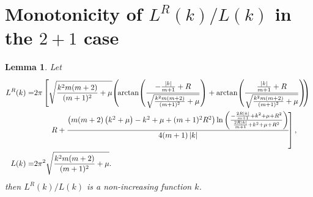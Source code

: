 \documentclass[a4paper,11pt]{article}
\newtheorem{lemma}{Lemma}
\numberwithin{equation}{section}
\begin{document}
\section{Monotonicity of $ L^R(k)/L(k)$ in the $ 2+1 $ case }
\label{AppendixMonotonicityOfL^R/L}
\begin{lemma}\label{lemmaMonotonicityOfL^R/L}
	Let \begin{equation}
	\begin{aligned}
	L^R(k)=&2 \pi  \left[\sqrt{\frac{k^2 m (m+2)}{(m+1)^2}+\mu }\! \left(\!\arctan\!\left(\frac{-\frac{\left| k\right|}{m+1}+R}{ \sqrt{\frac{k^2 m (m+2)}{(m+1)^2}+\mu }}\right)+\arctan\!\left(\frac{\frac{\left| k\right| }{m+1}+R}{\sqrt{\frac{k^2 m (m+2)}{(m+1)^2}+\mu }}\right)\!\!\right)\vphantom{\frac{\ln\left(\frac{\frac{R}{R}}{\frac{R}{R}}\right)}{R}}\right.
	\\&
	\left.\qquad R+\frac{\left(m (m+2) \left(k^2+\mu \right)-k^2+\mu +(m+1)^2 R^2\right) \ln \left(\frac{-\frac{2 R \left| k\right| }{m+1}+k^2+\mu +R^2}{\frac{2 R \left| k\right| }{m+1}+k^2+\mu
			+R^2}\right)}{4(m+1) \left| k\right| }\!\right],\\
	L(k)=&2\pi^2\sqrt{\frac{k^2 m (m+2)}{(m+1)^2}+\mu }.
	\end{aligned}
	\end{equation}
	then $ L^R(k)/L(k) $ is a non-increasing function $ k $. 
\end{lemma}
\end{document}
